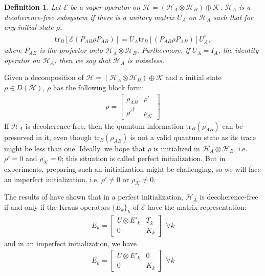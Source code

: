 \documentclass[journal]{IEEEtran}
\def\h{\ensuremath{\mathcal{H}}}
\def\k{\ensuremath{\mathcal{K}}}
\def\e{\ensuremath{\mathcal{E}}}
\def\k{\mathcal{K}}
\newtheorem{definition}{Definition}
\begin{document}
\begin{definition}\label{eq_dfs_def}
   Let $\e$ be a super-operator on $\h=(\h_A\otimes\h_B)\oplus\k $.
   $\h_A$ is a decoherence-free subsystem if there is a unitary matrix $U_A$ on $\h_A$ such that for any initial state $\rho$,\begin{eqnarray}\label{Eq_def_U}
     \textrm{tr}_{B}[\e(P_{AB}\rho P_{AB})]=U_A\textrm{tr}_{B}[(P_{AB}\rho P_{AB})]U_A^\dagger,
   \end{eqnarray}
   where $P_{AB}$ is the projector onto $\h_A\otimes \h_B$. 
  Furthermore, if $U_A=I_A$, the identity operator on $\h_A$, then we say that $\h_A$ is noiseless.  
\end{definition}



Given a decomposition of $\h=(\h_A\otimes \h_B)\oplus\k$ and a initial state $\rho\in D(\h)$, $\rho$ has the following block form:
  \begin{eqnarray}
  \rho=\left[ \begin{matrix}
  \rho_{AB}&\rho'\\
  \rho'^\dagger&\rho_\k
  \end{matrix}\right]
\end{eqnarray}
If $\h_A$ is decoherence-free, then the quantum information $\textrm{tr}_{B}(\rho_{AB})$ can be preserved in it, even though $\textrm{tr}_{B}(\rho_{AB})$ is not a valid quantum state as its  trace might be less than one. Ideally, we hope that $\rho$ is initialized in $\h_A\otimes\h_B$, i.e. $\rho'=0$ and $\rho_\k=0$; this situation is called perfect initialization. 
  But in experiments,  preparing such an initialization might be challenging, so we will face an imperfect initialization, i.e. $\rho'\not =0$ or $\rho_\k\not =0$.
 
  The results of \cite{shabani2005theory} have shown that in a perfect initialization, $\h_A$ is decoherence-free if and only if the Kraus operators $\{E_k\}_k$ of $\e$ have the matrix representation:
\begin{eqnarray}\label{Eq_perfect}
  E_{k}=\left [\begin{matrix}
  U\otimes E'_{k}&T_k\\
  0&K_k
\end{matrix}\right]\ \ \forall k
\end{eqnarray}
and in an imperfect initialization, we have
\begin{eqnarray}\label{Eq_imperfect}
  E_{k}=\left [\begin{matrix}
  U\otimes E'_{k}&0\\
  0&K_k
\end{matrix}\right]\ \ \forall k
\end{eqnarray}
\end{document}
